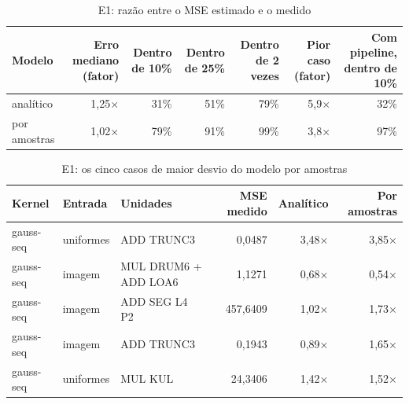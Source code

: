 
\begin{table}[htbp]
\centering
\caption{E1: razão entre o MSE estimado e o medido}
\begin{tabular}{|l|r|r|r|r|r|r|}
\hline
\rowcolor{tabAzul}\color{white}Modelo & \color{white}Erro mediano (fator) & \color{white}Dentro de 10\% & \color{white}Dentro de 25\% & \color{white}Dentro de 2 vezes & \color{white}Pior caso (fator) & \color{white}Com pipeline, dentro de 10\% \\
\hline
analítico & 1,25$\times$ & 31\% & 51\% & 79\% & 5,9$\times$ & 32\% \\ \hline
por amostras & 1,02$\times$ & 79\% & 91\% & 99\% & 3,8$\times$ & 97\% \\ \hline
\end{tabular}
\end{table}

\begin{table}[htbp]
\centering
\caption{E1: os cinco casos de maior desvio do modelo por amostras}
\begin{tabular}{|l|l|l|r|r|r|}
\hline
\rowcolor{tabAzul}\color{white}Kernel & \color{white}Entrada & \color{white}Unidades & \color{white}MSE medido & \color{white}Analítico & \color{white}Por amostras \\
\hline
gauss-seq & uniformes & ADD TRUNC3 & 0,0487 & 3,48$\times$ & 3,85$\times$ \\ \hline
gauss-seq & imagem & MUL DRUM6 + ADD LOA6 & 1,1271 & 0,68$\times$ & 0,54$\times$ \\ \hline
gauss-seq & imagem & ADD SEG L4 P2 & 457,6409 & 1,02$\times$ & 1,73$\times$ \\ \hline
gauss-seq & imagem & ADD TRUNC3 & 0,1943 & 0,89$\times$ & 1,65$\times$ \\ \hline
gauss-seq & uniformes & MUL KUL & 24,3406 & 1,42$\times$ & 1,52$\times$ \\ \hline
\end{tabular}
\end{table}

